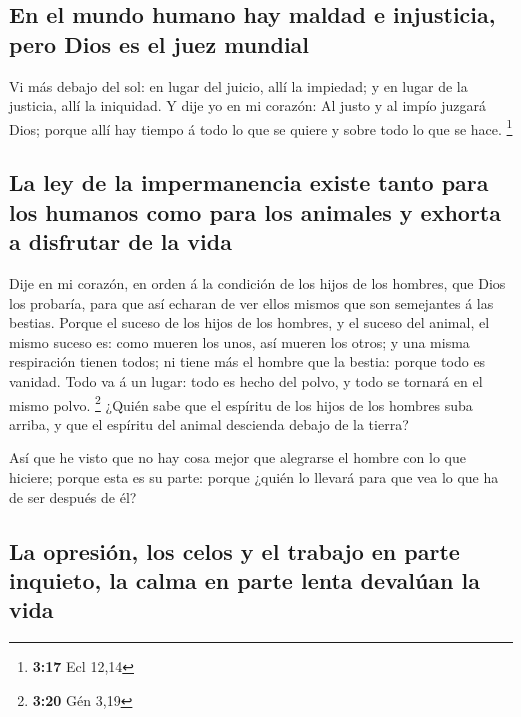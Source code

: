 \hypertarget{en-el-mundo-humano-hay-maldad-e-injusticia-pero-dios-es-el-juez-mundial}{%
\subsection{En el mundo humano hay maldad e injusticia, pero Dios es el
juez
mundial}\label{en-el-mundo-humano-hay-maldad-e-injusticia-pero-dios-es-el-juez-mundial}}

 Vi más debajo del sol: en lugar del juicio, allí la
impiedad; y en lugar de la justicia, allí la iniquidad. 
Y dije yo en mi corazón: Al justo y al impío juzgará Dios; porque allí
hay tiempo á todo lo que se quiere y sobre todo lo que se hace.
\footnote{\textbf{3:17} Ecl 12,14}

\hypertarget{la-ley-de-la-impermanencia-existe-tanto-para-los-humanos-como-para-los-animales-y-exhorta-a-disfrutar-de-la-vida}{%
\subsection{La ley de la impermanencia existe tanto para los humanos
como para los animales y exhorta a disfrutar de la
vida}\label{la-ley-de-la-impermanencia-existe-tanto-para-los-humanos-como-para-los-animales-y-exhorta-a-disfrutar-de-la-vida}}

 Dije en mi corazón, en orden á la condición de los hijos
de los hombres, que Dios los probaría, para que así echaran de ver ellos
mismos que son semejantes á las bestias.  Porque el
suceso de los hijos de los hombres, y el suceso del animal, el mismo
suceso es: como mueren los unos, así mueren los otros; y una misma
respiración tienen todos; ni tiene más el hombre que la bestia: porque
todo es vanidad.  Todo va á un lugar: todo es hecho del
polvo, y todo se tornará en el mismo polvo. \footnote{\textbf{3:20} Gén
  3,19}  ¿Quién sabe que el espíritu de los hijos de los
hombres suba arriba, y que el espíritu del animal descienda debajo de la
tierra?

 Así que he visto que no hay cosa mejor que alegrarse el
hombre con lo que hiciere; porque esta es su parte: porque ¿quién lo
llevará para que vea lo que ha de ser después de él?

\hypertarget{la-opresiuxf3n-los-celos-y-el-trabajo-en-parte-inquieto-la-calma-en-parte-lenta-devaluxfaan-la-vida}{%
\subsection{La opresión, los celos y el trabajo en parte inquieto, la
calma en parte lenta devalúan la
vida}\label{la-opresiuxf3n-los-celos-y-el-trabajo-en-parte-inquieto-la-calma-en-parte-lenta-devaluxfaan-la-vida}}

